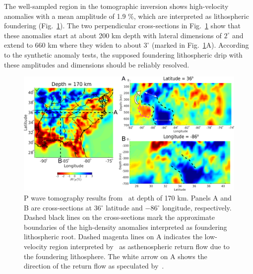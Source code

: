 \documentclass[draft,linenumbers]{agujournal2018}
\begin{document}
    The well-sampled region in the tomographic inversion shows
    high-velocity anomalies with a mean amplitude of 1.9 \%, which are interpreted as lithospheric foundering (Fig.~\ref{fig_tomo}). The two perpendicular cross-sections in Fig.~\ref{fig_tomo} show that these anomalies start at about 200 km depth with lateral dimensions of $2^\circ$ and extend to 660 km where they widen to about $3^\circ$ (marked in Fig.~\ref{fig_tomo}A). According to the synthetic anomaly tests, the supposed foundering lithospheric drip with these amplitudes and dimensions should be reliably resolved.
%
\begin{figure}[ht]
    \centering
    \includegraphics[width=\linewidth]{figures/figure_tomography.png}
    \caption{P wave tomography results from~\citep{Biryol_2016} at depth of 170 km. Panels A and B are cross-sections at 36$^\circ$ latitude and $-$86$^{\circ}$ longitude, respectively. Dashed black lines on the cross-sections mark the approximate boundaries of the high-density anomalies interpreted as foundering lithospheric root. Dashed magenta lines on A indicates the low-velocity region interpreted by~\citet{Biryol_2016} as asthenospheric return flow due to the foundering lithosphere. The white arrow on A shows the direction of the return flow as speculated by~\citet{Biryol_2016}.}
    \label{fig_tomo}
 \end{figure}
\end{document}
